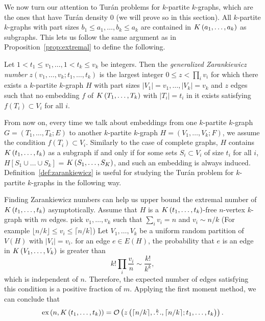 We now turn our attention to Turán problems for $k$-partite $k$-graphs,
which are the ones that have Turán density $0$ (we will prove so in this section).
All $k$-partite $k$-graphs with part sizes $b_1 \leq a_1, \dots, b_k \leq a_k$
are contained in $K\left(a_1, \dots, a_k\right)$ as subgraphs.
This lets us follow the same argument as in Proposition~\ref{prop:extremal}
to define the following.

\begin{definition}\label{def:zarankiewicz}
    Let $1 < t_1 \leq v_1, \dots, 1 < t_k \leq v_k$ be integers.
    Then the \emph{generalized Zarankiewicz number} $z(v_1, \dots, v_k; t_1, \dots, t_k)$
    is the largest integer $0 \leq z < \prod_i{ v_i}$ for which there exists a $k$-partite $k$-graph
    $H$ with part sizes $ |V_1| = v_1, \dots, |V_k| = v_k$ and $z$ edges
    such that no embedding $f$ of $K\left(T_1, \dots, T_k\right)$ with $|T_i| = t_i$ in it exists
    satisfying $f(T_i) \subset V_i$ for all $i$.
\end{definition}

From now on, every time we talk about embeddings from one $k$-partite $k$-graph
$G = (T_1, \dots, T_k; E)$ to another $k$-partite $k$-graph $H = (V_1, \dots, V_k; F)$,
we assume the condition $f(T_i) \subset V_i$.
Similarly to the case of complete graphs,
$H$ contains $K\left(t_1, \dots, t_k\right)$ as a subgraph if and only if
for some sets $S_i \subset V_i$ of size $t_i$ for all $i$,
$H[S_1 \cup \dots \cup S_k]$ = $K\left(S_1, \dots, S_K\right)$,
and such an embedding is always induced.
Definition~\ref{def:zarankiewicz} is useful for studying the Turán problem for $k$-partite $k$-graphs
in the following way.

\begin{remark}\label{rem:zar_vs_turan}
    Finding Zarankiewicz numbers can help us upper bound the extremal number of $K\left(t_1, \dots, t_k\right)$ asymptotically.
    Assume that $H$ is a $K\left(t_1, \dots, t_k\right)$-free $n$-vertex $k$-graph with $m$ edges.
    pick $v_1, \dots, v_k$ such that $\sum_{i} v_i = n $ and $v_i \sim n/k $
    (For example $\lfloor n/k \rfloor \leq v_i \leq \lceil n/k \rceil$)
    Let $V_1, \dots, V_k$ be a uniform random partition of $V(H)$ with $|V_i| = v_i$.
    for an edge $e \in E(H)$, the probability that $e$ is an edge in $K\left(V_1, \dots, V_k\right)$ is
    greater than
    \[k! \prod_i \frac{v_i}{n} \sim \frac{k!}{k^k},\]
    which is independent of $n$.
    Therefore, the expected number of edges satisfying this condition is a positive fraction of $m$.
    Applying the first moment method, we can conclude that
    \[
        \text{ex} \left( n, K\left(t_1, \dots, t_k\right) \right) = \mathcal{O}\left(z\left(\lceil n / k \rceil, \overset{k}{\dots}, \lceil n / k \rceil; t_1, \dots, t_k\right)\right).
    \]

\end{remark}

